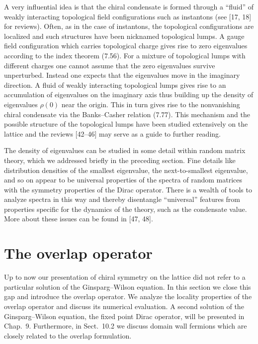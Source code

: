 A very influential idea is that the chiral condensate is formed through a
``fluid'' of weakly interacting topological field configurations such as
instantons (see [17, 18] for reviews). Often, as in the case of instantons,
the topological configurations are localized and such structures have been
nicknamed topological lumps. A gauge field configuration which carries
topological charge gives rise to zero eigenvalues according to the index
theorem (7.56). For a mixture of topological lumps with different charges one
cannot assume that the zero eigenvalues survive unperturbed. Instead one
expects that the eigenvalues move in the imaginary direction. A fluid of
weakly interacting topological lumps gives rise to an accumulation of
eigenvalues on the imaginary axis thus building up the density of eigenvalues
$\rho(0)$ near the origin. This in turn gives rise to the nonvanishing chiral
condensate via the Banks--Casher relation (7.77). This mechanism and the
possible structure of the topological lumps have been studied extensively on
the lattice and the reviews [42--46] may serve as a guide to further reading.

The density of eigenvalues can be studied in some detail within random matrix
theory, which we addressed briefly in the preceding section. Fine details like
distribution densities of the smallest eigenvalue, the next-to-smallest
eigenvalue, and so on appear to be universal properties of the spectra of
random matrices with the symmetry properties of the Dirac operator. There is a
wealth of tools to analyze spectra in this way and thereby disentangle
``universal'' features from properties specific for the dynamics of the
theory, such as the condensate value. More about these issues can be found in
[47, 48].

\section{The overlap operator}

Up to now our presentation of chiral symmetry on the lattice did not refer to
a particular solution of the Ginsparg--Wilson equation. In this section we
close this gap and introduce the overlap operator. We analyze the locality
properties of the overlap operator and discuss its numerical evaluation. A
second solution of the Ginsparg--Wilson equation, the fixed point Dirac
operator, will be presented in Chap.~9. Furthermore, in Sect.~10.2 we discuss
domain wall fermions which are closely related to the overlap formulation.

